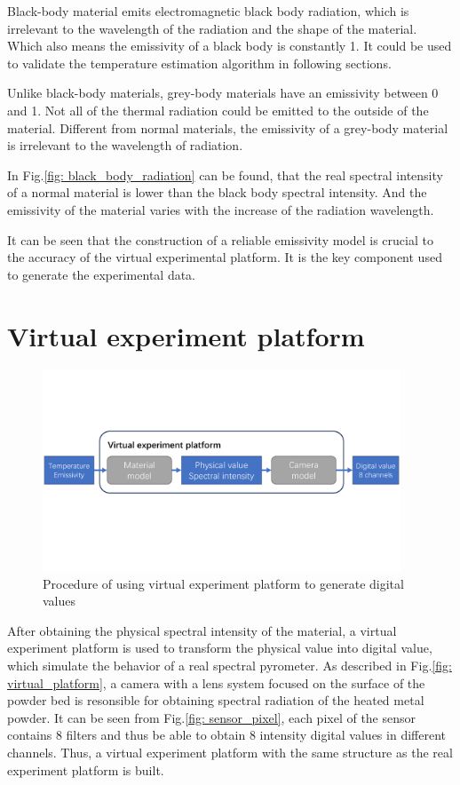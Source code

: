 Black-body material emits electromagnetic black body radiation, which is irrelevant to 
the wavelength of the radiation and the shape of the material\cite{Kuhn.1987}. Which 
also means the emissivity of a black body is constantly 1. It could be used to validate
the temperature estimation algorithm in following sections.


Unlike black-body materials, grey-body materials have an emissivity between 0 and 1.
Not all of the thermal radiation could be emitted to the outside of the material. 
Different from normal materials, the emissivity of a grey-body material is irrelevant
to the wavelength of radiation.


In Fig.\ref{fig: black_body_radiation} can be found, that the real spectral 
intensity of a normal material is lower than the black body spectral intensity.
And the emissivity of the material varies with the increase of the radiation 
wavelength.


It can be seen that the construction of a reliable emissivity model is crucial to 
the accuracy of the virtual experimental platform. It is the key component used to 
generate the experimental data.


\section{Virtual experiment platform}%
\begin{figure}[htbp]
    \centering
    \includegraphics[width=0.95\textwidth]{figures/camera_model.pdf}
    \caption{Procedure of using virtual experiment platform to generate digital values}
    \label{fig: process_virtual_platform}
\end{figure}
After obtaining the physical spectral intensity of the material, a virtual experiment platform
is used to transform the physical value into digital value, which simulate the 
behavior of a real spectral pyrometer. As described in Fig.\ref{fig: virtual_platform}, a 
camera with a lens system focused on the surface of the powder bed is resonsible 
for obtaining spectral radiation of the heated metal powder. It can be seen from 
Fig.\ref{fig: sensor_pixel}, each pixel of the sensor 
contains 8 filters and thus be able to obtain 8 intensity digital values in different 
channels. Thus, a virtual experiment platform with the same structure as the real 
experiment platform is built.

